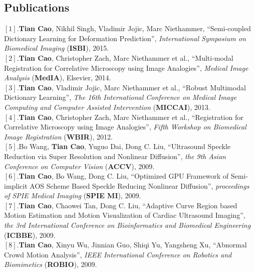 \documentclass[line,margin]{res}
\begin{document}
\begin{resume}
\section{\sc Publications}  
\smallskip
$[1]$.\textbf{Tian Cao}, Nikhil Singh, Vladimir Jojic, Marc Niethammer, ``Semi-coupled Dictionary Learning for Deformation Prediction'', \emph{International Symposium on Biomedical Imaging} (\textbf{ISBI}), 2015. \vspace{.05in}\\
$[2]$.\textbf{Tian Cao}, Christopher Zach, Marc Niethammer et al., ``Multi-modal Registration for Correlative Microscopy using Image Analogies'', \emph{Medical Image Analysis} (\textbf{MedIA}), Elsevier, 2014. \vspace{.05in}\\
$[3]$.\textbf{Tian Cao}, Vladimir Jojic, Marc Niethammer et al., ``Robust Multimodal Dictionary Learning'', \emph{The 16th International Conference on Medical Image Computing and Computer Assisted Intervention} (\textbf{MICCAI}), 2013. \vspace{.05in}\\ 
$[4]$.\textbf{Tian Cao}, Christopher Zach, Marc Niethammer et al., ``Registration for Correlative Microscopy using Image Analogies'',  \emph{Fifth Workshop on Biomedical Image Registration} (\textbf{WBIR}), 2012. \vspace{.05in}\\%
$[5]$.Bo Wang, \textbf{Tian Cao}, Yuguo Dai, Dong C. Liu, ``Ultrasound Speckle Reduction via Super Resolution and Nonlinear Diffusion'',  \emph{the 9th Asian Conference on Computer Vision} (\textbf{ACCV}), 2009. \vspace{.05in}\\
$[6]$.\textbf{Tian Cao}, Bo Wang, Dong C. Liu, ``Optimized GPU Framework of Semi-implicit AOS
Scheme Based Speckle Reducing Nonlinear Diffusion'',  \emph{proceedings of SPIE Medical Imaging} (\textbf{SPIE MI}), 2009.\vspace{.05in}\\%
$[7]$.\textbf{Tian Cao}, Chaowei Tan, Dong C. Liu, ``Adaptive Curve Region based Motion Estimation and Motion Visualization of Cardiac Ultrasound Imaging'',  \emph{the 3rd International Conference on Bioinformatics and Biomedical Engineering} (\textbf{ICBBE}), 2009.\vspace{.05in}\\
$[8]$.\textbf{Tian Cao}, Xinyu Wu, Jinnian Guo, Shiqi Yu, Yangsheng Xu, ``Abnormal Crowd Motion Analysis'', \emph{IEEE International Conference on Robotics and Biomimetics} (\textbf{ROBIO}), 2009.


\end{resume}
\end{document}
